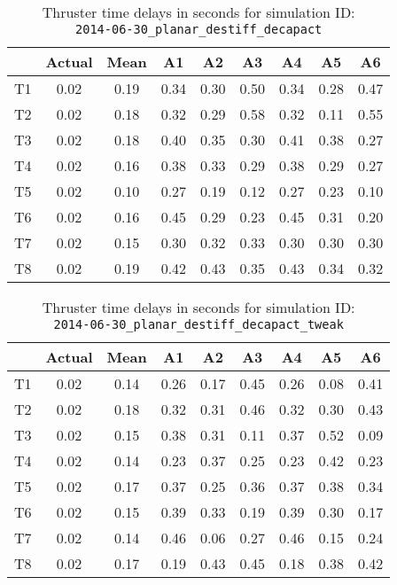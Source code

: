 \begin{table}[H]
\centering
\cprotect\caption{Thruster time delays in seconds for simulation ID:\\
\verb|2014-06-30_planar_destiff_decapact|}
\begin{tabular}{|c|c|c|c|c|c|c|c|c|} \hline
~ & Actual & Mean & A1 & A2 & A3 & A4 & A5 & A6 \\ \hline
T1 & 0.02 & 0.19 & 0.34 & 0.30 & 0.50 & 0.34 & 0.28 & 0.47 \\
T2 & 0.02 & 0.18 & 0.32 & 0.29 & 0.58 & 0.32 & 0.11 & 0.55 \\
T3 & 0.02 & 0.18 & 0.40 & 0.35 & 0.30 & 0.41 & 0.38 & 0.27 \\
T4 & 0.02 & 0.16 & 0.38 & 0.33 & 0.29 & 0.38 & 0.29 & 0.27 \\
T5 & 0.02 & 0.10 & 0.27 & 0.19 & 0.12 & 0.27 & 0.23 & 0.10 \\
T6 & 0.02 & 0.16 & 0.45 & 0.29 & 0.23 & 0.45 & 0.31 & 0.20 \\
T7 & 0.02 & 0.15 & 0.30 & 0.32 & 0.33 & 0.30 & 0.30 & 0.30 \\
T8 & 0.02 & 0.19 & 0.42 & 0.43 & 0.35 & 0.43 & 0.34 & 0.32 \\ \hline
\end{tabular}
\label{delay-3}
\end{table}

\begin{table}[H]
\centering
\cprotect\caption{Thruster time delays in seconds for simulation ID:\\
\verb|2014-06-30_planar_destiff_decapact_tweak|}
\begin{tabular}{|c|c|c|c|c|c|c|c|c|} \hline
~ & Actual & Mean & A1 & A2 & A3 & A4 & A5 & A6 \\ \hline
T1 & 0.02 & 0.14 & 0.26 & 0.17 & 0.45 & 0.26 & 0.08 & 0.41 \\
T2 & 0.02 & 0.18 & 0.32 & 0.31 & 0.46 & 0.32 & 0.30 & 0.43 \\
T3 & 0.02 & 0.15 & 0.38 & 0.31 & 0.11 & 0.37 & 0.52 & 0.09 \\
T4 & 0.02 & 0.14 & 0.23 & 0.37 & 0.25 & 0.23 & 0.42 & 0.23 \\
T5 & 0.02 & 0.17 & 0.37 & 0.25 & 0.36 & 0.37 & 0.38 & 0.34 \\
T6 & 0.02 & 0.15 & 0.39 & 0.33 & 0.19 & 0.39 & 0.30 & 0.17 \\
T7 & 0.02 & 0.14 & 0.46 & 0.06 & 0.27 & 0.46 & 0.15 & 0.24 \\
T8 & 0.02 & 0.17 & 0.19 & 0.43 & 0.45 & 0.18 & 0.38 & 0.42 \\ \hline
\end{tabular}
\label{delay-4}
\end{table}

